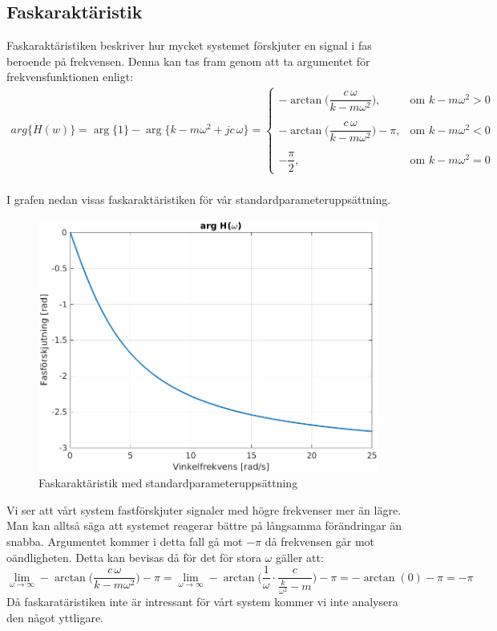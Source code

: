 \subsection{Faskaraktäristik}
Faskaraktäristiken beskriver hur mycket systemet förskjuter en signal i fas beroende på frekvensen. Denna kan tas fram genom att ta argumentet för frekvensfunktionen enligt:
\\$$\begin{aligned}arg\big\{H(w)\big\}=\arg\big\{1\big\}-\arg\big\{k-m\omega^2+jc\,\omega\big\}
=\begin{cases}
-\arctan\bigg(\dfrac{c\,\omega}{k-m\omega^2}\bigg), & \text{om } k-m\omega^2 > 0  \\\\
-\arctan\bigg(\dfrac{c\,\omega}{k-m\omega^2}\bigg)-\pi, & \text{om } k-m\omega^2 < 0 \\\\ 
-\dfrac{\pi}{2}, & \text{om } k-m\omega^2 = 0 
\end{cases}\end{aligned}$$
\\I grafen nedan visas faskaraktäristiken för vår standardparameteruppsättning.
\begin{figure}[H]
    \centering
    \includegraphics[scale=0.75]{bilder/faskaraktaristik}
    \caption{Faskaraktäristik med standardparameteruppsättning}
    \label{fig:faskaraktaristik}
\end{figure}
Vi ser att vårt system fastförskjuter signaler med högre frekvenser mer än lägre. Man kan alltså säga att systemet reagerar bättre på långsamma förändringar än snabba.
Argumentet kommer i detta fall gå mot $-\pi$ då frekvensen går mot oändligheten. Detta kan bevisas då för det för stora $\omega$  gäller att:
$$\lim_{\omega\to\infty}-\arctan\bigg(\dfrac{c\,\omega}{k-m\omega^2}\bigg)-\pi=
\lim_{\omega\to\infty}-\arctan\Bigg(\dfrac{1}{\omega}\cdot\frac{c}{\frac{k}{\omega^2}-m}\Bigg)-\pi=-\arctan(0)-\pi=-\pi$$
Då faskaratäristiken inte är intressant för vårt system kommer vi inte analysera den något yttligare.
\newpage
